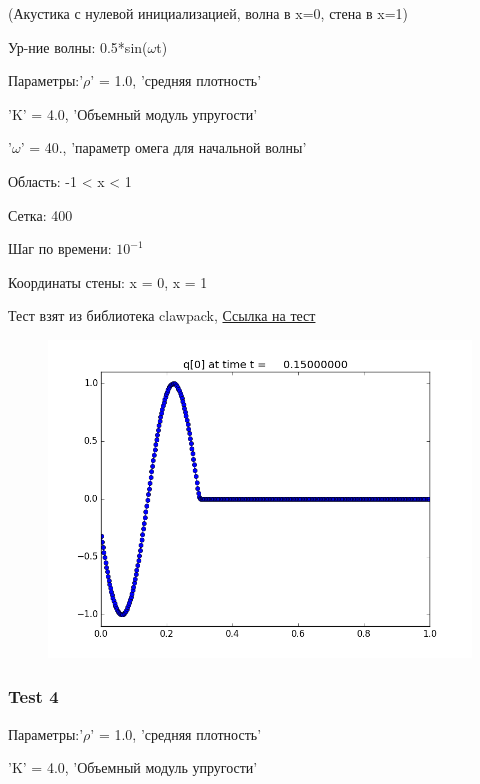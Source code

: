 \documentclass{article}
\begin{document}
 (Акустика с нулевой инициализацией, волна в x=0, стена в x=1)
 
Ур-ние волны: 0.5*sin($\omega$t)
 
Параметры:'$\rho$' = 1.0,  'средняя плотность'
 
             'K' = 4.0,  'Объемный модуль упругости'
             
             '$\omega$' = 40.,  'параметр омега для начальной волны'
             
Область: -1 < x < 1
 
Сетка: 400
 
Шаг по времени: $10^{-1}$
 
Координаты стены: x = 0, x = 1
 
   Тест взят из библиотека clawpack, \cite{clawpack}
   \href{http://www.clawpack.org/gallery/_static/apps/fvmbook/chap7/acouinflow/README.html}{Ссылка на тест}
   
 \begin{figure}[h]
  \begin{center}
    \includegraphics[scale=0.5]{1D_acoustic_test/TEST3/frame0003fig0.png}
  \end{center}
\end{figure}
   
 \subsubsection{Test 4}
Параметры:'$\rho$' = 1.0,  'средняя плотность'

             'K' = 4.0,  'Объемный модуль упругости'
             
\end{document}
